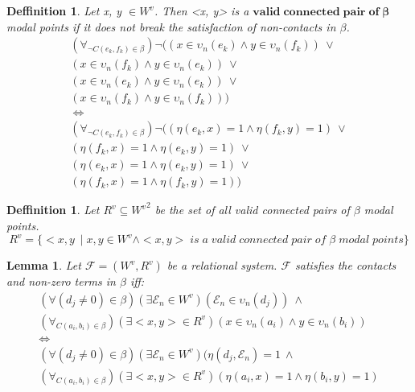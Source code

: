 \documentclass{article}
\newcommand\F{\mathcal{F}}
\newcommand\E{\mathcal{E}}
\newtheorem{lemma}[theorem]{Lemma}
\newtheorem{defn}[theorem]{Deffinition}
\begin{document}
		\begin{defn}
			Let x, y $\in W^v$. Then <x, y> is a $\mathbf{valid \; connected \; pair \; of \; \beta}$ modal points if it does not break the satisfaction of non-contacts in $\beta$.
			\begin{align*}
			(\forall_{\neg C(e_k, f_k) \in \beta})\neg(
			(x \in \upsilon_n(e_k) \land y \in \upsilon_n(f_k)) \:\lor \\
			(x \in \upsilon_n(f_k) \land y \in \upsilon_n(e_k)) \:\lor \\
			(x \in \upsilon_n(e_k) \land y \in \upsilon_n(e_k)) \:\lor \\
			(x \in \upsilon_n(f_k) \land y \in \upsilon_n(f_k))) \\ \:\iff \\
			(\forall_{\neg C(e_k, f_k) \in \beta})\neg(
			(\eta(e_k, x) = 1 \land \eta(f_k, y) = 1) \:\lor \\
			(\eta(f_k, x) = 1 \land \eta(e_k, y) = 1) \:\lor \\
			(\eta(e_k, x) = 1 \land \eta(e_k, y) = 1) \:\lor \\
			(\eta(f_k, x) = 1 \land \eta(f_k, y) = 1))
			\end{align*}
		\end{defn}

		\begin{defn}\label{set-all-valid-modal-point-pairs}
			Let $R^v \subseteq {W^v}^2$ be the set of all valid connected pairs of $\beta$ modal points.
			\begin{equation}
				R^v = \{ <x, y\> \mid x, y \in W^v \land <x, y> \; is \; a \; valid \; connected \; pair \; of \; \beta \; modal \; points\}
			\end{equation}
		\end{defn}

		\begin{lemma}\label{satisfied-contacts-non-zero-terms}
			Let $\F = (W^v, R^v)$ be a relational system. $\F$ satisfies the contacts and non-zero terms in $\beta$ iff:
			\begin{align*}
				(\forall (d_j \neq 0) \in \beta)(\exists \E_n \in W^v)(\E_n \in \upsilon_n(d_j)) \: \land \\
				(\forall_{C(a_i, b_i) \in \beta})(\exists <x, y> \in R^v)(x \in \upsilon_n(a_i) \land y \in \upsilon_n(b_i)) \\ \iff \\
				(\forall (d_j \neq 0) \in \beta)(\exists \E_n \in W^v)(\eta(d_j, \E_n) = 1 \: \land \\
				(\forall_{C(a_i, b_i) \in \beta})(\exists <x, y> \in R^v)(\eta(a_i, x) = 1 \land \eta(b_i, y) = 1)
			\end{align*}
		\end{lemma}
\end{document}
